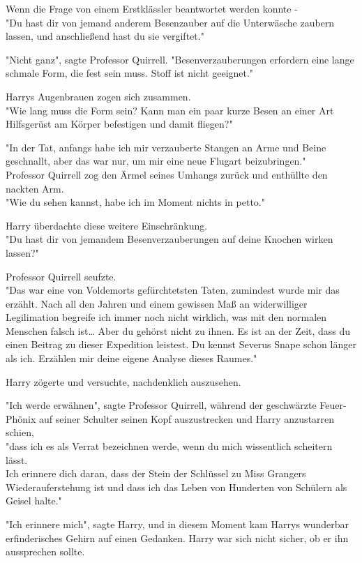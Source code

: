 {Wenn die Frage von einem Erstklässler beantwortet werden konnte -\\ "Du hast dir von jemand anderem Besenzauber auf die Unterwäsche zaubern lassen, und anschließend hast du sie vergiftet."

"Nicht ganz", sagte Professor Quirrell. "Besenverzauberungen erfordern eine lange schmale Form, die fest sein muss. Stoff ist nicht geeignet."

Harrys Augenbrauen zogen sich zusammen.\\ "Wie lang muss die Form sein? Kann man ein paar kurze Besen an einer Art Hilfsgerüst am Körper befestigen und damit fliegen?"

"In der Tat, anfangs habe ich mir verzauberte Stangen an Arme und Beine geschnallt, aber das war nur, um mir eine neue Flugart beizubringen."\\ Professor Quirrell zog den Ärmel seines Umhangs zurück und enthüllte den nackten Arm.\\ "Wie du sehen kannst, habe ich im Moment nichts in petto."

Harry überdachte diese weitere Einschränkung.\\ "Du hast dir von jemandem Besenverzauberungen auf deine Knochen wirken lassen?"

Professor Quirrell seufzte.\\ "Das war eine von Voldemorts gefürchtetsten Taten, zumindest wurde mir das erzählt. Nach all den Jahren und einem gewissen Maß an widerwilliger Legilimation begreife ich immer noch nicht wirklich, was mit den normalen Menschen falsch ist… Aber du gehörst nicht zu ihnen. Es ist an der Zeit, dass du einen Beitrag zu dieser Expedition leistest. Du kennst Severus Snape schon länger als ich. Erzählen mir deine eigene Analyse dieses Raumes."

Harry zögerte und versuchte, nachdenklich auszusehen.

"Ich werde erwähnen", sagte Professor Quirrell, während der geschwärzte Feuer-Phönix auf seiner Schulter seinen Kopf auszustrecken und Harry anzustarren schien,\\ "dass ich es als Verrat bezeichnen werde, wenn du mich wissentlich scheitern lässt.\\ Ich erinnere dich daran, dass der Stein der Schlüssel zu Miss Grangers Wiederauferstehung ist und dass ich das Leben von Hunderten von Schülern als Geisel halte."

"Ich erinnere mich", sagte Harry, und in diesem Moment kam Harrys wunderbar erfinderisches Gehirn auf einen Gedanken. Harry war sich nicht sicher, ob er ihn aussprechen sollte.

}
